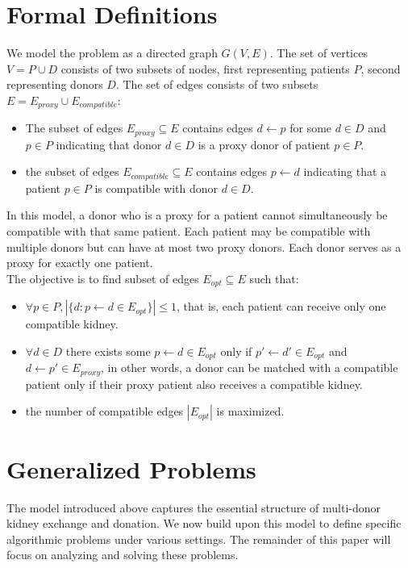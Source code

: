 \section{Formal Definitions}
We model the problem as a directed graph $G(V, E)$. The set of vertices $V = P \cup D$ consists of two subsets of nodes, first representing patients $P$, second representing donors $D$. The set of edges consists of two subsets $E = E_{proxy} \cup E_{compatible}$:
\begin{itemize}
    \item The subset of edges $E_{proxy} \subseteq E$ contains edges $d \leftarrow p$ for some $d \in D$ and $p \in P$ indicating that donor $d \in D$ is a proxy donor of patient $p \in P$.
    \item the subset of edges $E_{compatible} \subseteq E$ contains edges $p \leftarrow d$ indicating that a patient $p \in P$ is compatible with donor $d \in D$.
\end{itemize}
In this model, a donor who is a proxy for a patient cannot simultaneously be compatible with that same patient. Each patient may be compatible with multiple donors but can have at most two proxy donors. Each donor serves as a proxy for exactly one patient.\\
The objective is to find subset of edges $E_{opt} \subseteq E$ such that:
\begin{itemize}
    \item $\forall p \in P, \left|\{ d : p \leftarrow d \in E_{opt} \}\right| \le 1$, that is, each patient can receive only one compatible kidney.
    \item $\forall d \in D$ there exists some $ p \leftarrow d \in E_{opt}$ only if $p' \leftarrow d' \in E_{opt}$ and $d \leftarrow p' \in E_{proxy}$, in other words, a donor can be matched with a compatible patient only if their proxy patient also receives a compatible kidney.
    \item the number of compatible edges $|E_{opt}|$ is maximized.
\end{itemize}

\section{Generalized Problems}

The model introduced above captures the essential structure of multi-donor kidney exchange and donation. We now build upon this model to define specific algorithmic problems under various settings. The remainder of this paper will focus on analyzing and solving these problems.

